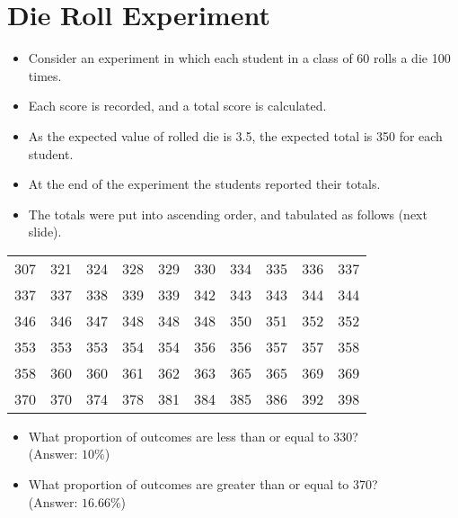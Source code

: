 \documentclass[]{report}
\begin{document}
\section{Die Roll Experiment}

\begin{itemize}
	\item Consider an experiment in which each student in a class of 60 rolls a die 100 times.
	\item Each score is recorded, and a total score is calculated.
	\item As the expected value of rolled die is 3.5, the expected total is 350 for each student.
	\item At the end of the experiment the students reported their totals.
	\item The totals were put into ascending order, and tabulated as follows (next slide).
\end{itemize}




\small
\begin{center}
	\begin{tabular}{|c c c c c c c c c c|}
		\hline
		307 & 321 & 324 & 328 & 329 & 330 & 334 & 335 & 336 &337 \\
		337 & 337 & 338 & 339 & 339 & 342 & 343 & 343 & 344 &344 \\
		346 & 346 & 347 & 348 & 348 & 348 & 350 & 351 & 352 &352 \\
		353 & 353 & 353 & 354 & 354 & 356 & 356 & 357 & 357 &358 \\
		358 & 360 & 360 & 361 & 362 & 363 & 365 & 365 & 369 &369 \\
		370 & 370 & 374 & 378 & 381 & 384 & 385 & 386 & 392 &398 \\
		\hline
	\end{tabular}
\end{center}
\normalsize
\begin{itemize}
	\item What proportion of outcomes are less than or equal to 330? \\ (Answer: $10\%$)
	\item What proportion of outcomes are greater than or equal to 370?\\ (Answer: $16.66\%$)
\end{itemize}
\end{document}
